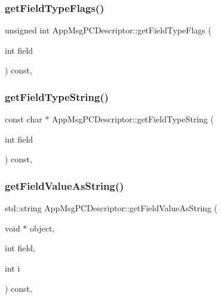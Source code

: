 \subsubsection{\texorpdfstring{get\+Field\+Type\+Flags()}{getFieldTypeFlags()}}
{\footnotesize\ttfamily unsigned int App\+Msg\+P\+C\+Descriptor\+::get\+Field\+Type\+Flags (\begin{DoxyParamCaption}\item[{int}]{field }\end{DoxyParamCaption}) const\hspace{0.3cm}{\ttfamily [override]}, {\ttfamily [virtual]}}

\mbox{\label{class_app_msg_p_c_descriptor_aa5a22389b1a0d2b8e97c936f69a2ed39}} 
\subsubsection{\texorpdfstring{get\+Field\+Type\+String()}{getFieldTypeString()}}
{\footnotesize\ttfamily const char $\ast$ App\+Msg\+P\+C\+Descriptor\+::get\+Field\+Type\+String (\begin{DoxyParamCaption}\item[{int}]{field }\end{DoxyParamCaption}) const\hspace{0.3cm}{\ttfamily [override]}, {\ttfamily [virtual]}}

\mbox{\label{class_app_msg_p_c_descriptor_ac5f4467bbe2dae35c300f7288bfc4003}} 
\subsubsection{\texorpdfstring{get\+Field\+Value\+As\+String()}{getFieldValueAsString()}}
{\footnotesize\ttfamily std\+::string App\+Msg\+P\+C\+Descriptor\+::get\+Field\+Value\+As\+String (\begin{DoxyParamCaption}\item[{void $\ast$}]{object,  }\item[{int}]{field,  }\item[{int}]{i }\end{DoxyParamCaption}) const\hspace{0.3cm}{\ttfamily [override]}, {\ttfamily [virtual]}}

